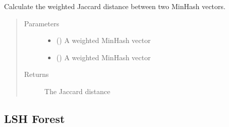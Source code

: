 \documentclass[letterpaper,10pt,english]{sphinxmanual}
\begin{document}
\begin{fulllineitems}
\begin{fulllineitems}
\label{\detokenize{documentation:tmap.Minhash.get_weighted_distance}}
Calculate the weighted Jaccard distance between two MinHash vectors.
\begin{quote}\begin{description}
\item[{Parameters}] \leavevmode\begin{itemize}
\item {} 
 () \textendash{} A weighted MinHash vector

\item {} 
 () \textendash{} A weighted MinHash vector

\end{itemize}

\item[{Returns}] \leavevmode
{} The Jaccard distance

\end{description}\end{quote}

\end{fulllineitems}


\end{fulllineitems}



\subsection{LSH Forest}
\label{\detokenize{documentation:lsh-forest}}\label{\detokenize{documentation:lshforest-doc}}
\end{document}
